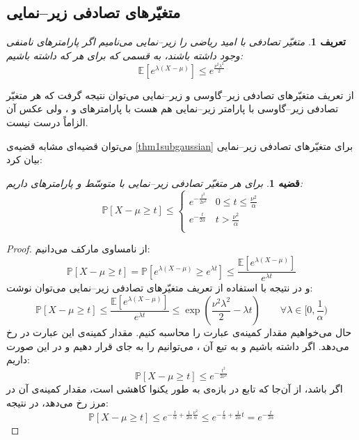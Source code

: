 \documentclass[a4paper,12pt]{article}
\newtheorem{den}{{\large\bf تعریف}}[section]
\newtheorem{thm}{{\large\bf قضیه}}[section]
\newcommand{\E}{\mathbb{E}}
\newcommand{\Prob}{\mathbb{P}}
\begin{document}
	\subsection{متغیّرهای تصادفی زیر--نمایی}
	\begin{den}
		متغیّر تصادفی
		با امید ریاضی
		\lr{$\mu = \E[X]$}
		را زیر--نمایی می‌نامیم اگر پارامترهای نامنفی
		\lr{$(\nu,\alpha)$}
		وجود داشته باشند، به قسمی که برای هر
		\lr{$\lambda$}
		که
		داشته باشیم:
		\[\E\left[e^{\lambda(X-\mu)}\right]\leq e^{\frac{\nu^2\lambda^2}{2}}\]
	\end{den}
	از تعریف متغیّرهای تصادفی زیر--گاوسی و زیر--نمایی می‌توان نتیجه گرفت که هر متغیّر تصادفی زیر--گاوسی با پارامتر
	\lr{$\sigma$}
	زیر--نمایی هم هست با پارامترهای
	\lr{$\nu=\sigma$}
	و
	،
	ولی عکس آن الزاماً درست نیست.
	
	می‌توان قضیه‌ای مشابه قضیه‌ی
	\ref{thm1subgaussian}
	برای متغیّرهای تصادفی زیر--نمایی بیان کرد:
	\begin{thm}\label{thm1subexponential}
		برای هر متغیّر تصادفی زیر--نمایی با متوسّط
		\lr{$\mu = \E[X]$}
		و پارامترهای
		\lr{$\nu,\alpha$}
		داریم:
		\begin{equation}
		\Prob[X-\mu\geq t] \leq \begin{cases}
		e^{-\frac{t^2}{2\nu^2}} &  0\leq t \leq \frac{\nu^2}{\alpha}\\
		e^{-\frac{t}{2\alpha}} &  t>\frac{\nu^2}{\alpha}\\
		\end{cases}
		\end{equation}
	\end{thm}
	\begin{proof}
		از نامساوی مارکف می‌دانیم:
		\[\Prob[X-\mu\geq t] = \Prob[e^{\lambda(X-\mu)}\geq e^{\lambda t}] \leq \frac{\E\left[e^{\lambda(X-\mu)}\right]}{e^{\lambda t}}\]
		و در نتیجه با استفاده از تعریف متغیّرهای تصادفی زیر--نمایی می‌توان نوشت:
		\[\Prob[X-\mu\geq t] \leq \frac{\E\left[e^{\lambda(X-\mu)}\right]}{e^{\lambda t}} \leq \exp(\frac{\nu^2\lambda^2}{2} - \lambda t) \qquad \forall \lambda\in[0,\frac{1}{\alpha})\]
		حال می‌خواهیم مقدار کمینه‌ی عبارت
		را محاسبه کنیم. مقدار کمینه‌ی این عبارت در
		رخ می‌دهد. اگر داشته باشیم
		\lr{$\frac{t}{\nu^2}\in[0,\frac{1}{\alpha})$}
		و به تبع آن
		،
		می‌توانیم
		\lr{$\lambda^*$}
		را به جای
		\lr{$\lambda$}
		قرار دهیم و در این صورت داریم:
		\[\Prob[X-\mu\geq t]\leq e^{-\frac{t^2}{2\nu^2}}\]
		اگر 
		باشد، از آن‌جا که تابع
		در بازه‌ی
		\lr{$[0,\lambda^*]$}
		به طور یکنوا کاهشی است، مقدار کمینه‌ی آن در مرز
		رخ می‌دهد، در نتیجه:
		\[\Prob[X-\mu\geq t]\leq e^{-\frac{t}{\alpha} + \frac{1}{2\alpha}\frac{\nu^2}{\alpha}} \leq e^{-\frac{t}{\alpha} + \frac{1}{2\alpha}t} = e^{-\frac{t}{2\alpha}} \]
	\end{proof}
	
\end{document}
